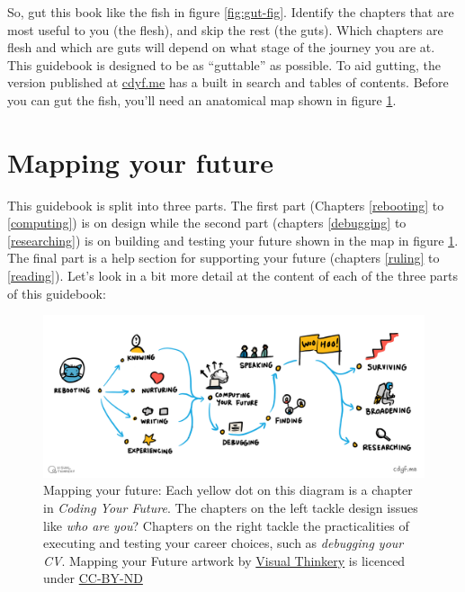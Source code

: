 \documentclass[
]{book}
\begin{document}
So, gut this book like the fish in figure \ref{fig:gut-fig}. Identify the chapters that are most useful to you (the flesh), and skip the rest (the guts). Which chapters are flesh and which are guts will depend on what stage of the journey you are at. This guidebook is designed to be as ``guttable'' as possible. To aid gutting, the version published at \href{https://www.cdyf.me/}{cdyf.me} has a built in search and tables of contents. Before you can gut the fish, you'll need an anatomical map shown in figure \ref{fig:map-fig}.

\hypertarget{mapping}{%
\section{Mapping your future}\label{mapping}}

This guidebook is split into three parts. The first part (Chapters \ref{rebooting} to \ref{computing}) is on design while the second part (chapters \ref{debugging} to \ref{researching}) is on building and testing your future shown in the map in figure \ref{fig:map-fig}. The final part is a help section for supporting your future (chapters \ref{ruling} to \ref{reading}). Let's look in a bit more detail at the content of each of the three parts of this guidebook:

\begin{figure}

{\centering \includegraphics[width=1\linewidth]{images/Course Map V3} 

}

\caption{Mapping your future: Each yellow dot on this diagram is a chapter in \emph{Coding Your Future}. The chapters on the left tackle design issues like \emph{who are you}? Chapters on the right tackle the practicalities of executing and testing your career choices, such as \emph{debugging your CV}. Mapping your Future artwork by \href{https://visualthinkery.com/}{Visual Thinkery} is licenced under \href{https://creativecommons.org/licenses/by-nd/4.0/}{CC-BY-ND}}\label{fig:map-fig}
\end{figure}
\end{document}
